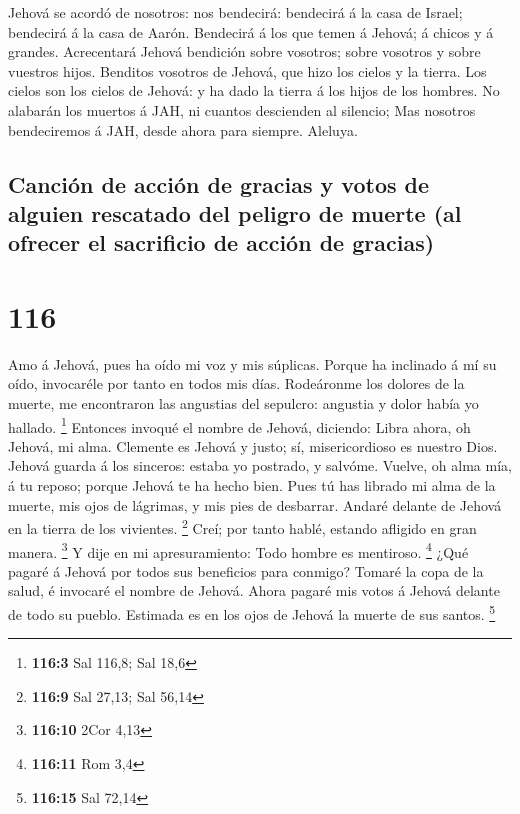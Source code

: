  Jehová se acordó de nosotros: nos bendecirá: bendecirá á
la casa de Israel; bendecirá á la casa de Aarón.  Bendecirá
á los que temen á Jehová; á chicos y á grandes. 
Acrecentará Jehová bendición sobre vosotros; sobre vosotros y sobre
vuestros hijos.  Benditos vosotros de Jehová, que hizo los
cielos y la tierra.  Los cielos son los cielos de Jehová: y
ha dado la tierra á los hijos de los hombres.  No alabarán
los muertos á JAH, ni cuantos descienden al silencio;  Mas
nosotros bendeciremos á JAH, desde ahora para siempre. Aleluya.

\hypertarget{canciuxf3n-de-acciuxf3n-de-gracias-y-votos-de-alguien-rescatado-del-peligro-de-muerte-al-ofrecer-el-sacrificio-de-acciuxf3n-de-gracias}{%
\subsection{Canción de acción de gracias y votos de alguien rescatado
del peligro de muerte (al ofrecer el sacrificio de acción de
gracias)}\label{canciuxf3n-de-acciuxf3n-de-gracias-y-votos-de-alguien-rescatado-del-peligro-de-muerte-al-ofrecer-el-sacrificio-de-acciuxf3n-de-gracias}}

\hypertarget{section-115}{%
\section{116}\label{section-115}}

 Amo á Jehová, pues ha oído mi voz y mis súplicas.
 Porque ha inclinado á mí su oído, invocaréle por tanto en
todos mis días.  Rodeáronme los dolores de la muerte, me
encontraron las angustias del sepulcro: angustia y dolor había yo
hallado. \footnote{\textbf{116:3} Sal 116,8; Sal 18,6} 
Entonces invoqué el nombre de Jehová, diciendo: Libra ahora, oh Jehová,
mi alma.  Clemente es Jehová y justo; sí, misericordioso es
nuestro Dios.  Jehová guarda á los sinceros: estaba yo
postrado, y salvóme.  Vuelve, oh alma mía, á tu reposo;
porque Jehová te ha hecho bien.  Pues tú has librado mi alma
de la muerte, mis ojos de lágrimas, y mis pies de desbarrar.
 Andaré delante de Jehová en la tierra de los vivientes.
\footnote{\textbf{116:9} Sal 27,13; Sal 56,14}  Creí; por
tanto hablé, estando afligido en gran manera. \footnote{\textbf{116:10}
  2Cor 4,13}  Y dije en mi apresuramiento: Todo hombre es
mentiroso. \footnote{\textbf{116:11} Rom 3,4}  ¿Qué pagaré
á Jehová por todos sus beneficios para conmigo?  Tomaré la
copa de la salud, é invocaré el nombre de Jehová.  Ahora
pagaré mis votos á Jehová delante de todo su pueblo. 
Estimada es en los ojos de Jehová la muerte de sus santos. \footnote{\textbf{116:15}
  Sal 72,14}

